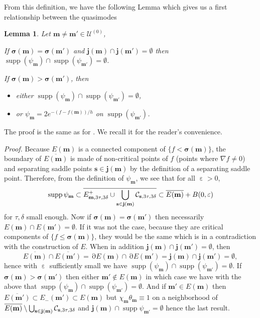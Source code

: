 \documentclass[12pt]{amsart}
\newcommand{\supp}{\operatorname{supp}}
\newcommand{\bsigma}{\boldsymbol{\sigma}}
\newcommand{\bp}{{\it Proof. }}
\numberwithin{equation}{section}
\numberwithin{figure}{section}
\def\m{\mathbf{m}}
\def\s{\mathbf{s}}
\def\j{\mathbf{j}}
\DeclareMathOperator{\p}{\partial}
\DeclareMathOperator{\eps}{\varepsilon}
\newtheorem{lemma}[defin]{Lemma}
\def\uuu{{\mathcal U}}\def\vvv{{\mathcal V}}\def\www{{\mathcal W}}\def\xxx{{\mathcal X}}
\begin{document}
From this definition, we have the following Lemma which gives us a first relationship between the quasimodes
\begin{lemma}\label{lem:supppsi}Let $\m\neq\m'\in\uuu^{(0)}$,

    If $\bsigma(\m) = \bsigma(\m')$ and $\j(\m)\cap\j(\m')=\emptyset$ then $\supp(\psi_\m)\cap\supp(\psi_{\m'}) = \emptyset$.

    If $\bsigma(\m) > \bsigma(\m')$, then
    \begin{itemize}
        \item[$\star$] either $\supp(\psi_\m)\cap\supp(\psi_{\m'}) = \emptyset$,
        \item[$\star$] or $\psi_\m = 2e^{-(f-f(\m))/h}$ on $\supp(\psi_{\m'})$.
    \end{itemize}
\end{lemma}

The proof is the same as for \cite[Lemma 4.4]{BoLePMi22}. We recall it for the reader's convenience.

\bp Because $E(\m)$ is a connected component of $\{f<\bsigma(\m)\}$, the boundary of $\overline{E(\m)}$ is made of non-critical points of $f$ (points where $\nabla f\neq0$) and separating saddle points $\s\in\j(\m)$ by the definition of a separating saddle point. Therefore, from the definition of $\psi_\m$, we see that for all $\eps>0$,
\begin{equation*}
\supp\psi_\m\subset \overline{E^+_{\m,3\tau,3\delta}\cup\bigcup_{\s\in\j(\m)}\ccc_{\s,3\tau,3\delta}}\subset\overline{E(\m)}+B(0,\eps)
\end{equation*}
for $\tau,\delta$ small enough. Now if $\bsigma(\m) = \bsigma(\m')$ then necessarily $E(\m)\cap E(\m') = \emptyset$. If it was not the case, because they are critical components of $\{f\leq\bsigma(\m)\}$, they would be the same which is in a contradiction with the construction of $E$. When in addition $\j(\m)\cap\j(\m')=\emptyset$, then
\begin{equation*}
\overline{E(\m)}\cap\overline{E(\m')} = \p E(\m)\cap\p E(\m') = \j(\m)\cap\j(\m') = \emptyset,
\end{equation*}
hence with $\eps$ sufficiently small we have $\supp(\psi_\m)\cap\supp(\psi_{\m'}) = \emptyset$. If $\bsigma(\m) > \bsigma(\m')$ then either $\m'\notin E(\m)$ in which case we have with the above that $\supp(\psi_\m)\cap\supp(\psi_{\m'}) = \emptyset$. And if $\m'\in E(\m)$ then $\overline{E(\m')}\subset E_-(\m')\subset E(\m)$ but $\chi_\m\theta_\m\equiv1$ on a neighborhood of $\overline{E(\m)}\setminus\bigcup_{\s\in\j(\m)}\ccc_{\s,3\tau,3\delta}$ and $\j(\m)\cap\supp\psi_{\m'}=\emptyset$ hence the last result.
\end{document}
